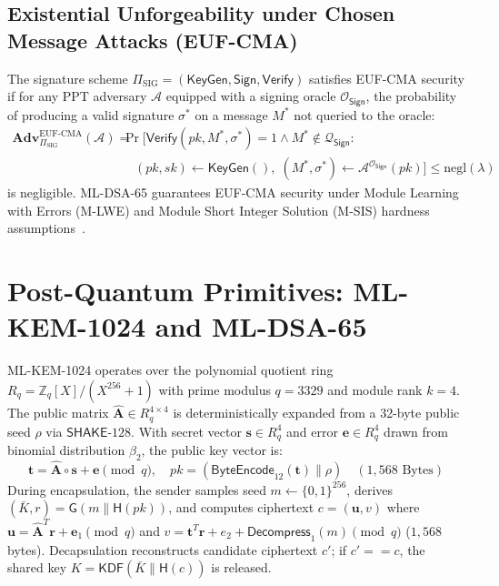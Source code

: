 \subsection{Existential Unforgeability under Chosen Message Attacks (EUF-CMA)}
The signature scheme $\Pi_{\text{SIG}} = (\mathsf{KeyGen}, \mathsf{Sign}, \mathsf{Verify})$ satisfies EUF-CMA security if for any PPT adversary $\mathcal{A}$ equipped with a signing oracle $\mathcal{O}_{\mathsf{Sign}}$, the probability of producing a valid signature $\sigma^*$ on a message $M^*$ not queried to the oracle:
\begin{equation}
\begin{split}
\mathbf{Adv}_{\Pi_{\text{SIG}}}^{\text{EUF-CMA}}(\mathcal{A}) = {} & \Pr\Big[\mathsf{Verify}(pk, M^*, \sigma^*) = 1 \wedge M^* \notin \mathcal{Q}_{\mathsf{Sign}} : \\
& \quad (pk, sk) \leftarrow \mathsf{KeyGen}(), \; (M^*, \sigma^*) \leftarrow \mathcal{A}^{\mathcal{O}_{\mathsf{Sign}}}(pk) \Big] \le \text{negl}(\lambda)
\end{split}
\end{equation}
is negligible. ML-DSA-65 guarantees EUF-CMA security under Module Learning with Errors (M-LWE) and Module Short Integer Solution (M-SIS) hardness assumptions~\cite{dilithium2022specs,nist_fips_204}.

\section{Post-Quantum Primitives: ML-KEM-1024 and ML-DSA-65}
\label{sec:pqc_primitives_mechanics}

ML-KEM-1024 operates over the polynomial quotient ring $R_q = \mathbb{Z}_q[X] / (X^{256} + 1)$ with prime modulus $q = 3329$ and module rank $k = 4$. The public matrix $\hat{\mathbf{A}} \in R_q^{4 \times 4}$ is deterministically expanded from a 32-byte public seed $\rho$ via $\mathsf{SHAKE}\text{-}128$. With secret vector $\mathbf{s} \in R_q^4$ and error $\mathbf{e} \in R_q^4$ drawn from binomial distribution $\beta_2$, the public key vector is:
\begin{equation}
\mathbf{t} = \hat{\mathbf{A}} \circ \mathbf{s} + \mathbf{e} \pmod q, \quad pk = (\mathsf{ByteEncode}_{12}(\mathbf{t}) \parallel \rho) \quad (1,568\text{ Bytes})
\end{equation}
During encapsulation, the sender samples seed $m \leftarrow \{0, 1\}^{256}$, derives $(\bar{K}, r) = \mathsf{G}(m \parallel \mathsf{H}(pk))$, and computes ciphertext $c = (\mathbf{u}, v)$ where $\mathbf{u} = \hat{\mathbf{A}}^T \mathbf{r} + \mathbf{e}_1 \pmod q$ and $v = \mathbf{t}^T \mathbf{r} + e_2 + \mathsf{Decompress}_1(m) \pmod q$ ($1,568$ bytes). Decapsulation reconstructs candidate ciphertext $c'$; if $c' == c$, the shared key $K = \mathsf{KDF}(\bar{K} \parallel \mathsf{H}(c))$ is released.

